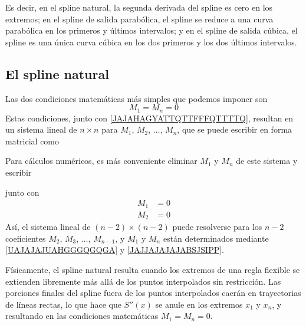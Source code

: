 \noindent Es decir, en el spline natural, la segunda derivada del spline es cero en los extremos; en el spline de salida parabólica, el spline se reduce a una curva parabólica en los primeros y últimos intervalos; y en el spline de salida cúbica, el spline es una única curva cúbica en los dos primeros y los dos últimos intervalos.

\subsection*{El spline natural}

Las dos condiciones matemáticas más simples que podemos imponer son
$$M_1 = M_n = 0$$
Estas condiciones, junto con \eqref{JAJAHAGYATTQTTFFFQTTTTQ}, resultan en un sistema lineal de $n \times n$ para $M_1$, $M_2$, $\dots$, $M_n$, que se puede escribir en forma matricial como
\begin{matrizn}
\end{matrizn}
Para cálculos numéricos, es más conveniente eliminar $M_1$ y $M_n$ de este sistema y escribir
\begin{matrizn}
\end{matrizn}
junto con
\begin{align}
    M_1 & = 0 \label{UAJAJAJUAHGGGQGQGA} \\
    M_2 & = 0 \label{JAJJAJAJAJABSJSIPP}
\end{align}\newpage\noindent
Así, el sistema lineal de $(n - 2) \times (n - 2)$ puede resolverse para los $n - 2$ coeficientes $M_2$, $M_3$, $\dots$, $M_{n-1}$, y $M_1$ y $M_n$ están determinados mediante \eqref{UAJAJAJUAHGGGQGQGA} y \eqref{JAJJAJAJAJABSJSIPP}.

Físicamente, el spline natural resulta cuando los extremos de una regla flexible se extienden libremente más allá de los puntos interpolados sin restricción. Las porciones finales del spline fuera de los puntos interpolados caerán en trayectorias de líneas rectas, lo que hace que $S''(x)$ se anule en los extremos $x_1$ y $x_n$, y resultando en las condiciones matemáticas $M_1 = M_n = 0$.

